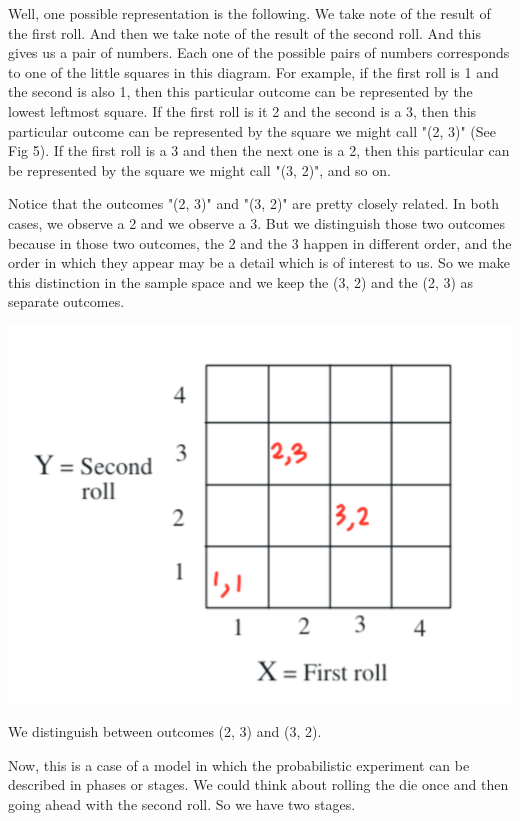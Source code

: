 \documentclass{tufte-handout}
\begin{document}
Well, one possible representation is the following. We take note of the result of the first roll.
And then we take note of the result of the second roll. And this gives us a pair of numbers.
Each one of the possible pairs of numbers corresponds to one of the little squares in this diagram. For
example, if the first roll is 1 and the second is also 1, then this particular outcome can be represented 
by the lowest leftmost square. If the first roll is it 2 and the second is a 3, then this particular outcome 
can be represented by the square we might call "(2, 3)" (See Fig 5). If the first roll is a 3 and then
the next one is a 2, then this particular can be represented by the square we might call "(3, 2)", and so on.

Notice that the outcomes "(2, 3)"  and "(3, 2)" are pretty closely related. In both cases, we observe a 2 and we
observe a 3. But we distinguish those two outcomes because in those two outcomes, the 2 and the 3
happen in different order, and the order in which they appear may be a detail which is of interest to us. So we make this
distinction in the sample space and we keep the (3, 2) and the (2, 3) as separate outcomes.

\begin{marginfigure}
  \includegraphics[width=\linewidth]{Dice2Annotated}
  \caption{We distinguish between outcomes (2, 3) and (3, 2).}
  \label{fig:marginfig}
\end{marginfigure}


\vspace{0.7cm}
Now, this is a case of a model in which the probabilistic experiment can be described in phases or
stages. We could think about rolling the die once and then going ahead with the second roll. So we
have two stages.
\end{document}
